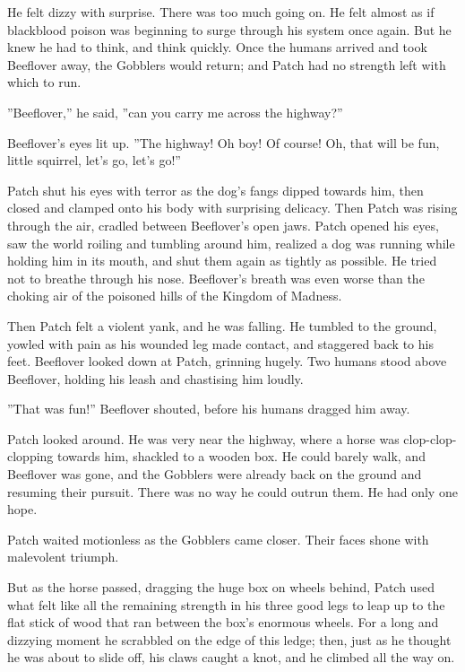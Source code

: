 \documentclass[11pt]{article}
\begin{document}
 He felt dizzy with surprise. There was too much going on. He felt almost as if blackblood poison was beginning to surge through his system once again. But he knew he had to think, and think quickly. Once the humans arrived and took Beeflover away, the Gobblers would return; and Patch had no strength left with which to run.\par
 ''Beeflover,'' he said, ''can you carry me across the highway?''\par
 Beeflover's eyes lit up. ''The highway! Oh boy! Of course! Oh, that will be fun, little squirrel, let's go, let's go!''\par
 Patch shut his eyes with terror as the dog's fangs dipped towards him, then closed and clamped onto his body with surprising delicacy. Then Patch was rising through the air, cradled between Beeflover's open jaws. Patch opened his eyes, saw the world roiling and tumbling around him, realized a dog was running while holding him in its mouth, and shut them again as tightly as possible. He tried not to breathe through his nose. Beeflover's breath was even worse than the choking air of the poisoned hills of the Kingdom of Madness.\par
 Then Patch felt a violent yank, and he was falling. He tumbled to the ground, yowled with pain as his wounded leg made contact, and staggered back to his feet. Beeflover looked down at Patch, grinning hugely. Two humans stood above Beeflover, holding his leash and chastising him loudly.\par
 ''That was fun!'' Beeflover shouted, before his humans dragged him away.\par
 Patch looked around. He was very near the highway, where a horse was clop-clop-clopping towards him, shackled to a wooden box. He could barely walk, and Beeflover was gone, and the Gobblers were already back on the ground and resuming their pursuit. There was no way he could outrun them. He had only one hope.\par
 Patch waited motionless as the Gobblers came closer. Their faces shone with malevolent triumph.\par
 But as the horse passed, dragging the huge box on wheels behind, Patch used what felt like all the remaining strength in his three good legs to leap up to the flat stick of wood that ran between the box's enormous wheels. For a long and dizzying moment he scrabbled on the edge of this ledge; then, just as he thought he was about to slide off, his claws caught a knot, and he climbed all the way on.\par
\end{document}
